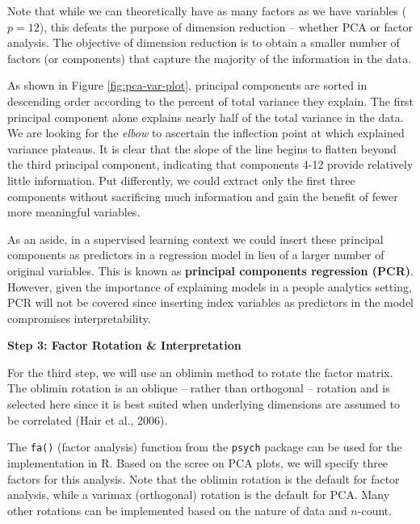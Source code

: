 \documentclass[
]{book}
\newenvironment{Shaded}{\begin{snugshade}}{\end{snugshade}}
\newcommand{\AttributeTok}[1]{\textcolor[rgb]{0.77,0.63,0.00}{#1}}
\newcommand{\CommentTok}[1]{\textcolor[rgb]{0.56,0.35,0.01}{\textit{#1}}}
\newcommand{\DecValTok}[1]{\textcolor[rgb]{0.00,0.00,0.81}{#1}}
\newcommand{\FunctionTok}[1]{\textcolor[rgb]{0.00,0.00,0.00}{#1}}
\newcommand{\NormalTok}[1]{#1}
\newcommand{\OtherTok}[1]{\textcolor[rgb]{0.56,0.35,0.01}{#1}}
\newcommand{\SpecialCharTok}[1]{\textcolor[rgb]{0.00,0.00,0.00}{#1}}
\newcommand{\StringTok}[1]{\textcolor[rgb]{0.31,0.60,0.02}{#1}}
\begin{document}
Note that while we can theoretically have as many factors as we have variables (\(p = 12\)), this defeats the purpose of dimension reduction -- whether PCA or factor analysis. The objective of dimension reduction is to obtain a smaller number of factors (or components) that capture the majority of the information in the data.

As shown in Figure \ref{fig:pca-var-plot}, principal components are sorted in descending order according to the percent of total variance they explain. The first principal component alone explains nearly half of the total variance in the data. We are looking for the \emph{elbow} to ascertain the inflection point at which explained variance plateaus. It is clear that the slope of the line begins to flatten beyond the third principal component, indicating that components 4-12 provide relatively little information. Put differently, we could extract only the first three components without sacrificing much information and gain the benefit of fewer more meaningful variables.

As an aside, in a supervised learning context we could insert these principal components as predictors in a regression model in lieu of a larger number of original variables. This is known as \textbf{principal components regression (PCR)}. However, given the importance of explaining models in a people analytics setting, PCR will not be covered since inserting index variables as predictors in the model compromises interpretability.

\textbf{Step 3: Factor Rotation \& Interpretation}

For the third step, we will use an oblimin method to rotate the factor matrix. The oblimin rotation is an oblique -- rather than orthogonal -- rotation and is selected here since it is best suited when underlying dimensions are assumed to be correlated (Hair et al., 2006).

The \texttt{fa()} (factor analysis) function from the \texttt{psych} package can be used for the implementation in R. Based on the scree on PCA plots, we will specify three factors for this analysis. Note that the oblimin rotation is the default for factor analysis, while a varimax (orthogonal) rotation is the default for PCA. Many other rotations can be implemented based on the nature of data and \(n\)-count.

\begin{Shaded}
\end{Shaded}
\end{document}

